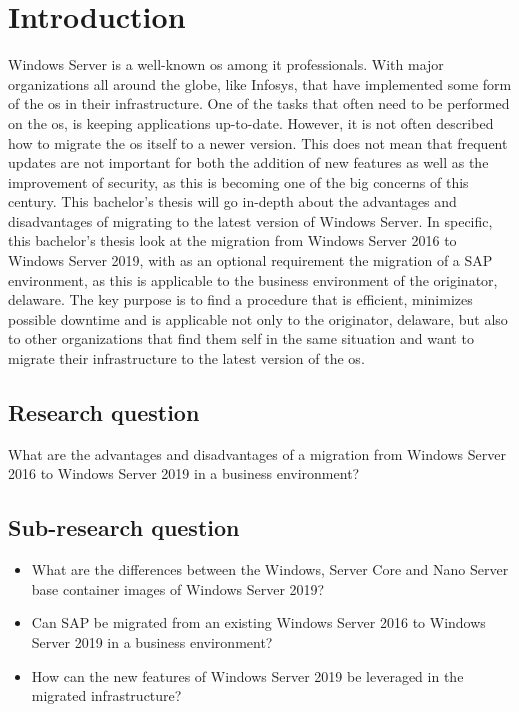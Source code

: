 \section{Introduction}\label{sec:introduction}
Windows Server is a well-known \acrfull{os} among \acrfull{it} professionals. With major organizations all around the globe, like Infosys, that have implemented some form of the \acrshort{os} in their infrastructure. \autocite{S.Chauhan2015}
One of the tasks that often need to be performed on the \acrshort{os}, is keeping applications up-to-date. However, it is not often described how to migrate the \acrshort{os} itself to a newer version.  
This does not mean that frequent updates are not important for both the addition of new features as well as the improvement of security, as this is becoming one of the big concerns of this century. 
This bachelor's thesis will go in-depth about the advantages and disadvantages of migrating to the latest version of Windows Server.
In specific, this bachelor's thesis look at the migration from Windows Server 2016 to Windows Server 2019, with as an optional requirement the migration of a SAP environment, as this is applicable to the business environment of the originator, delaware.
The key purpose is to find a procedure that is efficient, minimizes possible downtime and is applicable not only to the originator, delaware, but also to other organizations that find them self in the same situation and want to migrate their infrastructure to the latest version of the \acrshort{os}.
\subsection{Research question}
What are the advantages and disadvantages of a migration from Windows Server 2016 to Windows Server 2019 in a business environment?
\subsection{Sub-research question}
\begin{itemize}
	\item What are the differences between the Windows, Server Core and Nano Server base container images of Windows Server 2019?
	\item Can SAP be migrated from an existing Windows Server 2016 to Windows Server 2019 in a business environment?
	\item How can the new features of Windows Server 2019 be leveraged in the migrated infrastructure? 
\end{itemize}
